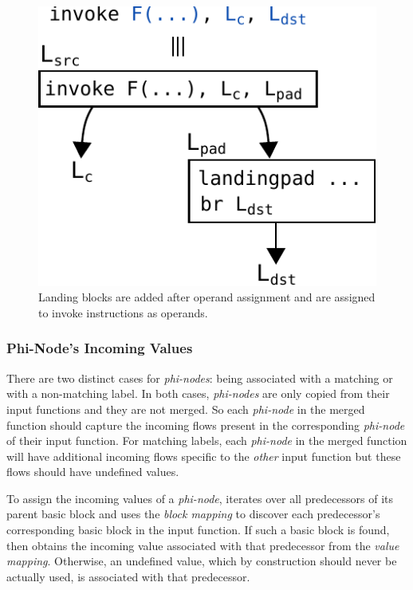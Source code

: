 \begin{figure}[t!]
  \centering
  \includegraphics[scale=0.65]{src/merge-operation/figs/landingpad.pdf}
  \caption{Landing blocks are added after operand assignment and
	are assigned to invoke instructions as operands.}
  \label{fig:landingpad}
\end{figure}

\subsubsection{Phi-Node's Incoming Values} \label{sec:phi-in-vals}

There are two distinct cases for \textit{phi-nodes}: being associated with a
matching or with a non-matching label. In both cases, \textit{phi-nodes} are
only copied from their input functions and they are not merged. So each
\textit{phi-node} in the merged function should capture the incoming flows
present in the corresponding \textit{phi-node} of their input function. For
matching labels, each \textit{phi-node} in the merged function will have
additional incoming flows specific to the \textit{other} input function but
these flows should have undefined values.

To assign the incoming values of a \textit{phi-node}, {\ProjName} iterates over
all predecessors of its parent basic block and uses the \textit{block mapping}
to discover each predecessor's corresponding basic block in the input function.
If such a basic block is found, then
{\ProjName} obtains the incoming value associated with that predecessor from the \textit{value mapping}.
Otherwise, an undefined value, which by construction should never be actually used,
is associated with that predecessor.

